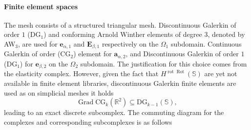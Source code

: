 \documentclass[11pt,a4paper]{article}
\newcommand{\bbR}{\mathbb{R}}
\newcommand{\bbS}{\mathbb{S}}
\DeclareMathOperator*{\Grad}{Grad}
\DeclareMathOperator*{\Div}{Div}
\DeclareMathOperator*{\rot}{rot}
\DeclareMathOperator*{\Rot}{Rot}
\begin{document}
\paragraph{Finite element spaces} The mesh consists of a structured triangular mesh. Discontinuous Galerkin of order $1$ (DG$_1$) and conforming Arnold Winther elements \cite{arnold2002elasticity} of degree $3$, denoted by AW$_3$, are used for $\bm{e}_{\alpha, 1}$ and $\bm{E}_{\beta, 1}$ respectively on the $\Omega_1$ subdomain. Continuous Galerkin of order (CG$_2$) element for $\bm{a}_{\alpha, 2}$, and Discontinuous Galerkin of order $1$ (DG$_1$) for $\bm{e}_{\beta, 2}$ on the $\Omega_2$ subdomain.  The justification for this choice comes from the elasticity complex. However, given the fact that $H^{\rot\Rot}(\bbS)$ are yet not available in finite element libraries, discontinuous Galerkin finite elements are used as on simplicial meshes it holds
$$
\Grad \mathrm{CG}_k(\bbR^2) \subseteq \mathrm{DG}_{k-1}(\bbS),
$$
leading to an exact discrete subcomplex. The commuting diagram for the complexes and corresponding subcomplexes is as follows


\begin{minipage}[t]{0.45\textwidth}
\begin{center}
\end{center}
\end{minipage} 
\begin{minipage}[t]{0.45\textwidth}
\begin{center}
\end{center}
\end{minipage}
\end{document}
